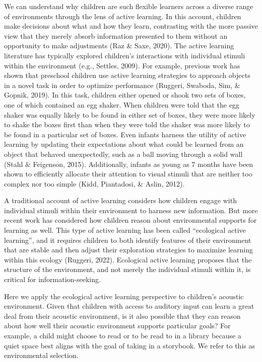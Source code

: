 \documentclass[10pt, letterpaper]{article}
\begin{document}
We can understand why children are such flexible learners across a
diverse range of environments through the lens of active learning. In
this account, children make decisions about what and how they learn,
contrasting with the more passive view that they merely absorb
information presented to them without an opportunity to make adjustments
(Raz \& Saxe, 2020). The active learning literature has typically
explored children's interactions with individual stimuli within the
environment (e.g., Settles, 2009). For example, previous work has shown
that preschool children use active learning strategies to approach
objects in a novel task in order to optimize performance (Ruggeri,
Swaboda, Sim, \& Gopnik, 2019). In this task, children either opened or
shook two sets of boxes, one of which contained an egg shaker. When
children were told that the egg shaker was equally likely to be found in
either set of boxes, they were more likely to shake the boxes first than
when they were told the shaker was more likely to be found in a
particular set of boxes. Even infants harness the utility of active
learning by updating their expectations about what could be learned from
an object that behaved unexpectedly, such as a ball moving through a
solid wall (Stahl \& Feigenson, 2015). Additionally, infants as young as
7 months have been shown to efficiently allocate their attention to
visual stimuli that are neither too complex nor too simple (Kidd,
Piantadosi, \& Aslin, 2012).

A traditional account of active learning considers how children engage
with individual stimuli within their environment to harness new
information. But more recent work has considered how children reason
about environmental supports for learning as well. This type of active
learning has been called ``ecological active learning'', and it requires
children to both identify features of their environment that are stable
and then adjust their exploration strategies to maximize learning within
this ecology (Ruggeri, 2022). Ecological active learning proposes that
the structure of the environment, and not merely the individual stimuli
within it, is critical for information-seeking.

Here we apply the ecological active learning perspective to children's
acoustic environment. Given that children with access to auditory input
can learn a great deal from their acoustic environment, is it also
possible that they can reason about how well their acoustic environment
supports particular goals? For example, a child might choose to read or
to be read to in a library because a quiet space best aligns with the
goal of taking in a storybook. We refer to this as environmental
selection.
\end{document}
